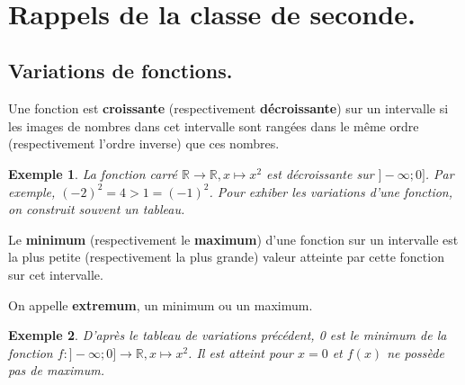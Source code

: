 \documentclass[a4paper,11pt]{article}
\title{}
\author{}
\date{}
\newcommand{\R}{\mathbb{R}}
\theoremstyle{break}
\newtheorem{exemple}{Exemple}
\newcounter{numero}
\newcommand{\exo}{
  \addtocounter{numero}{1}%
  \textbf{\underline{Exercice \arabic{numero}:}}\quad}
\begin{document}
  \setlength{\unitlength}{1mm}
  \setlength\parindent{0mm}
  
  
  ~
  \medskip
  
  \section{Rappels de la classe de seconde.}
  
  \subsection{Variations de fonctions.}
  
  \begin{Def}
    Une fonction est \textbf{croissante} (respectivement \textbf{décroissante}) sur un
    intervalle si les images de nombres dans cet intervalle sont rangées dans le même
    ordre (respectivement l'ordre inverse) que ces nombres.
  \end{Def}
  
  \begin{exemple}
    La fonction carré $\R \to \R, x \mapsto x^2$ est décroissante sur $]-\infty;0]$. 
    Par exemple, $(-2)^2=4>1=(-1)^2$. Pour exhiber les variations d'une fonction, 
    on construit souvent un tableau.
    
  \end{exemple}
  
  
  
  \begin{Def}
    Le \textbf{minimum} (respectivement le \textbf{maximum}) d’une fonction
    sur un intervalle est la plus petite (respectivement la plus grande) 
    valeur atteinte par cette fonction sur cet intervalle.
    
    On appelle \textbf{extremum}, un minimum ou un maximum.
  \end{Def}
  
  \begin{exemple}
    D'après le tableau de variations précédent, 0 est le minimum de la fonction
    $f:]-\infty ; 0] \to \R, x \mapsto x^2$. Il est atteint pour $x=0$ et $f(x)$
    ne possède pas de maximum.
  \end{exemple}
  
\end{document}
